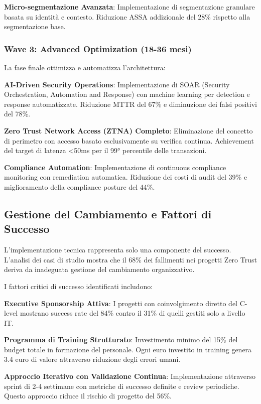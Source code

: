 \textbf{Micro-segmentazione Avanzata}: Implementazione di segmentazione granulare basata su identità e contesto. Riduzione ASSA addizionale del 28\% rispetto alla segmentazione base.

\subsubsection{Wave 3: Advanced Optimization (18-36 mesi)}

La fase finale ottimizza e automatizza l'architettura:

\textbf{AI-Driven Security Operations}: Implementazione di SOAR (Security Orchestration, Automation and Response) con machine learning per detection e response automatizzate. Riduzione MTTR del 67\% e diminuzione dei falsi positivi del 78\%.

\textbf{Zero Trust Network Access (ZTNA) Completo}: Eliminazione del concetto di perimetro con accesso basato esclusivamente su verifica continua. Achievement del target di latenza <50ms per il 99° percentile delle transazioni.

\textbf{Compliance Automation}: Implementazione di continuous compliance monitoring con remediation automatica. Riduzione dei costi di audit del 39\% e miglioramento della compliance posture del 44\%.

\subsection{Gestione del Cambiamento e Fattori di Successo}

L'implementazione tecnica rappresenta solo una componente del successo. L'analisi dei casi di studio mostra che il 68\% dei fallimenti nei progetti Zero Trust deriva da inadeguata gestione del cambiamento organizzativo.

I fattori critici di successo identificati includono:

\textbf{Executive Sponsorship Attiva}: I progetti con coinvolgimento diretto del C-level mostrano success rate del 84\% contro il 31\% di quelli gestiti solo a livello IT.

\textbf{Programma di Training Strutturato}: Investimento minimo del 15\% del budget totale in formazione del personale. Ogni euro investito in training genera 3.4 euro di valore attraverso riduzione degli errori umani.

\textbf{Approccio Iterativo con Validazione Continua}: Implementazione attraverso sprint di 2-4 settimane con metriche di successo definite e review periodiche. Questo approccio riduce il rischio di progetto del 56\%.

